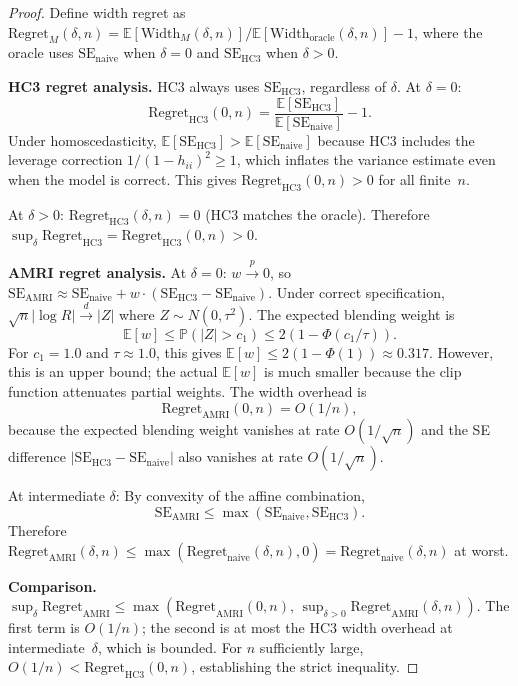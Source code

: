 \documentclass[12pt]{article}
\theoremstyle{definition}
\theoremstyle{remark}
\newcommand{\E}{\mathbb{E}}
\newcommand{\Prob}{\mathbb{P}}
\newcommand{\se}{\mathrm{SE}}
\newcommand{\plim}{\overset{p}{\to}}
\newcommand{\dlim}{\overset{d}{\to}}
\begin{document}
\begin{proof}
Define width regret as $\mathrm{Regret}_M(\delta, n) = \E[\mathrm{Width}_M(\delta, n)] / \E[\mathrm{Width}_{\mathrm{oracle}}(\delta, n)] - 1$, where the oracle uses $\se_{\mathrm{naive}}$ when $\delta = 0$ and $\se_{\mathrm{HC3}}$ when $\delta > 0$.

\textbf{HC3 regret analysis.}
HC3 always uses $\se_{\mathrm{HC3}}$, regardless of $\delta$. At $\delta = 0$:
\[
\mathrm{Regret}_{\mathrm{HC3}}(0, n) = \frac{\E[\se_{\mathrm{HC3}}]}{\E[\se_{\mathrm{naive}}]} - 1.
\]
Under homoscedasticity, $\E[\se_{\mathrm{HC3}}] > \E[\se_{\mathrm{naive}}]$ because HC3 includes the leverage correction $1/(1-h_{ii})^2 \geq 1$, which inflates the variance estimate even when the model is correct. This gives $\mathrm{Regret}_{\mathrm{HC3}}(0, n) > 0$ for all finite~$n$.

At $\delta > 0$: $\mathrm{Regret}_{\mathrm{HC3}}(\delta, n) = 0$ (HC3 matches the oracle). Therefore $\sup_\delta \mathrm{Regret}_{\mathrm{HC3}} = \mathrm{Regret}_{\mathrm{HC3}}(0, n) > 0$.

\textbf{AMRI regret analysis.}
At $\delta = 0$: $w \plim 0$, so $\se_{\mathrm{AMRI}} \approx \se_{\mathrm{naive}} + w \cdot (\se_{\mathrm{HC3}} - \se_{\mathrm{naive}})$. Under correct specification, $\sqrt{n}|\log R| \dlim |Z|$ where $Z \sim N(0, \tau^2)$. The expected blending weight is
\[
\E[w] \leq \Prob(|Z| > c_1) \leq 2(1 - \Phi(c_1/\tau)).
\]
For $c_1 = 1.0$ and $\tau \approx 1.0$, this gives $\E[w] \leq 2(1 - \Phi(1)) \approx 0.317$. However, this is an upper bound; the actual $\E[w]$ is much smaller because the clip function attenuates partial weights. The width overhead is
\[
\mathrm{Regret}_{\mathrm{AMRI}}(0, n) = O(1/n),
\]
because the expected blending weight vanishes at rate $O(1/\sqrt{n})$ and the SE difference $|\se_{\mathrm{HC3}} - \se_{\mathrm{naive}}|$ also vanishes at rate $O(1/\sqrt{n})$.

At intermediate $\delta$: By convexity of the affine combination,
\[
\se_{\mathrm{AMRI}} \leq \max(\se_{\mathrm{naive}}, \se_{\mathrm{HC3}}).
\]
Therefore $\mathrm{Regret}_{\mathrm{AMRI}}(\delta, n) \leq \max(\mathrm{Regret}_{\mathrm{naive}}(\delta,n), 0) = \mathrm{Regret}_{\mathrm{naive}}(\delta, n)$ at worst.

\textbf{Comparison.}
$\sup_\delta \mathrm{Regret}_{\mathrm{AMRI}} \leq \max(\mathrm{Regret}_{\mathrm{AMRI}}(0,n),\, \sup_{\delta > 0} \mathrm{Regret}_{\mathrm{AMRI}}(\delta, n))$. The first term is $O(1/n)$; the second is at most the HC3 width overhead at intermediate~$\delta$, which is bounded. For $n$ sufficiently large, $O(1/n) < \mathrm{Regret}_{\mathrm{HC3}}(0, n)$, establishing the strict inequality.
\end{proof}
\end{document}
